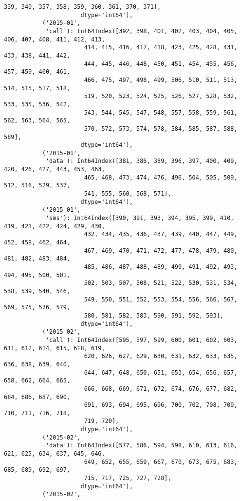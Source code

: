 \documentclass[11pt]{article}
\begin{document}
\begin{Verbatim}[commandchars=\\\{\}]
                       339, 340, 357, 358, 359, 360, 361, 370, 371],
                      dtype='int64'),
           ('2015-01',
            'call'): Int64Index([392, 398, 401, 402, 403, 404, 405, 406, 407, 408, 411, 412, 413,
                       414, 415, 416, 417, 418, 423, 425, 428, 431, 433, 438, 441, 442,
                       444, 445, 446, 448, 450, 451, 454, 455, 456, 457, 459, 460, 461,
                       466, 475, 497, 498, 499, 506, 510, 511, 513, 514, 515, 517, 518,
                       519, 520, 523, 524, 525, 526, 527, 528, 532, 533, 535, 536, 542,
                       543, 544, 545, 547, 548, 557, 558, 559, 561, 562, 563, 564, 565,
                       570, 572, 573, 574, 578, 584, 585, 587, 588, 589],
                      dtype='int64'),
           ('2015-01',
            'data'): Int64Index([381, 386, 389, 396, 397, 400, 409, 420, 426, 427, 443, 453, 463,
                       465, 468, 473, 474, 476, 496, 504, 505, 509, 512, 516, 529, 537,
                       541, 555, 560, 568, 571],
                      dtype='int64'),
           ('2015-01',
            'sms'): Int64Index([390, 391, 393, 394, 395, 399, 410, 419, 421, 422, 424, 429, 430,
                       432, 434, 435, 436, 437, 439, 440, 447, 449, 452, 458, 462, 464,
                       467, 469, 470, 471, 472, 477, 478, 479, 480, 481, 482, 483, 484,
                       485, 486, 487, 488, 489, 490, 491, 492, 493, 494, 495, 500, 501,
                       502, 503, 507, 508, 521, 522, 530, 531, 534, 538, 539, 540, 546,
                       549, 550, 551, 552, 553, 554, 556, 566, 567, 569, 575, 576, 579,
                       580, 581, 582, 583, 590, 591, 592, 593],
                      dtype='int64'),
           ('2015-02',
            'call'): Int64Index([595, 597, 599, 600, 601, 602, 603, 611, 612, 614, 615, 618, 619,
                       620, 626, 627, 629, 630, 631, 632, 633, 635, 636, 638, 639, 640,
                       644, 647, 648, 650, 651, 653, 654, 656, 657, 658, 662, 664, 665,
                       666, 668, 669, 671, 672, 674, 676, 677, 682, 684, 686, 687, 690,
                       691, 693, 694, 695, 696, 700, 702, 708, 709, 710, 711, 716, 718,
                       719, 720],
                      dtype='int64'),
           ('2015-02',
            'data'): Int64Index([577, 586, 594, 598, 610, 613, 616, 621, 625, 634, 637, 645, 646,
                       649, 652, 655, 659, 667, 670, 673, 675, 683, 685, 689, 692, 697,
                       715, 717, 725, 727, 728],
                      dtype='int64'),
           ('2015-02',

\end{Verbatim}
\end{document}
